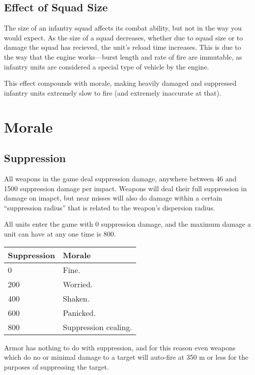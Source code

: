 \documentclass{article}
\begin{document}
\subsection{Effect of Squad Size}

The size of an infantry squad affects its combat ability, but not in the way you
would expect. As the size of a squad decreases, whether due to squad size or to
damage the squad has recieved, the unit's reload time increases. This is
due to the way that the engine works---burst length and rate of fire are
immutable, as infantry units are considered a special type of vehicle by the
engine.

This effect compounds with morale, making heavily damaged and suppressed
infantry units extremely slow to fire (and extremely inaccurate at that).

\section{Morale}

\subsection{Suppression}

All weapons in the game deal suppression damage, anywhere between 46 and 1500
suppression damage per impact. Weapons will deal their full suppression
in damage on imapct, but near misses will also do damage within a certain
``suppression radius'' that is related to the weapon's dispersion
radius.

All units enter the game with 0 suppression damage, and the maximum damage a
unit can have at any one time is 800.

\begin{center}
    \begin{tabular}{ | l | l | }
    \hline
    Suppression & Morale \\ \hline
    0 & Fine. \\
    200 & Worried. \\
    400 & Shaken. \\
    600 & Panicked. \\
    800 & Suppression cealing. \\
    \hline
    \end{tabular}
\end{center}

Armor has nothing to do with suppression, and for this reason even weapons which
do no or minimal damage to a target will auto-fire at 350 m or less for
the purposes of suppressing the target.
\end{document}
